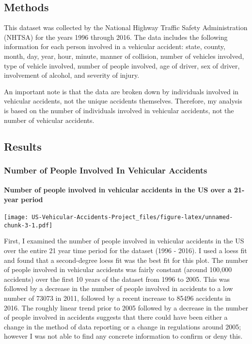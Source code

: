 \documentclass[]{article}
\let\oldparagraph\paragraph
\renewcommand{\paragraph}[1]{\oldparagraph{#1}\mbox{}}
\begin{document}
\hypertarget{methods}{%
\subsection{Methods}\label{methods}}

This dataset was collected by the National Highway Traffic Safety
Administration (NHTSA) for the years 1996 through 2016. The data
includes the following information for each person involved in a
vehicular accident: state, county, month, day, year, hour, minute,
manner of collision, number of vehicles involved, type of vehicle
involved, number of people involved, age of driver, sex of driver,
involvement of alcohol, and severity of injury.

An important note is that the data are broken down by individuals
involved in vehicular accidents, not the unique accidents themselves.
Therefore, my analysis is based on the number of individuals involved in
vehicular accidents, not the number of vehicular accidents.

\hypertarget{results}{%
\subsection{Results}\label{results}}

\hypertarget{number-of-people-involved-in-vehicular-accidents}{%
\subsubsection{Number of People Involved In Vehicular
Accidents}\label{number-of-people-involved-in-vehicular-accidents}}

\hypertarget{number-of-people-involved-in-vehicular-accidents-in-the-us-over-a-21-year-period}{%
\paragraph{Number of people involved in vehicular accidents in the US
over a 21-year
period}\label{number-of-people-involved-in-vehicular-accidents-in-the-us-over-a-21-year-period}}

\texttt{[image: US-Vehicular-Accidents-Project\_files/figure-latex/unnamed-chunk-3-1.pdf]}

First, I examined the number of people involved in vehicular accidents
in the US over the entire 21 year time period for the dataset (1996 -
2016). I used a loess fit and found that a second-degree loess fit was
the best fit for this plot. The number of people involved in vehicular
accidents was fairly constant (around 100,000 accidents) over the first
10 years of the dataset from 1996 to 2005. This was followed by a
decrease in the number of people involved in accidents to a low number
of 73073 in 2011, followed by a recent increase to 85496 accidents in
2016. The roughly linear trend prior to 2005 followed by a decrease in
the number of people involved in accidents suggests that there could
have been either a change in the method of data reporting or a change in
regulations around 2005; however I was not able to find any concrete
information to confirm or deny this.
\end{document}
